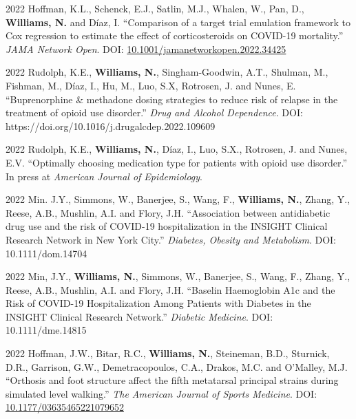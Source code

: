 \documentclass[12pt,letterpaper]{report}
\begin{document}
    \begin{tablist}
    
    		\item[2022] \tab Hoffman, K.L., Schenck, E.J., Satlin, M.J., Whalen, W., Pan, D., \textbf{Williams, N.} and Díaz, I. \enquote{Comparison of a target trial emulation framework to Cox regression to estimate the effect of corticosteroids on COVID-19 mortality.} \textit{JAMA Network Open}. DOI: \href{http://jamanetwork.com/article.aspx?doi=10.1001/jamanetworkopen.2022.34425}{10.1001/jamanetworkopen.2022.34425}
    
    	\item[2022] \tab Rudolph, K.E., \textbf{Williams, N.}, Singham-Goodwin, A.T., Shulman, M., Fishman, M., Díaz, I., Hu, M., Luo, S.X, Rotrosen, J. and Nunes, E. \enquote{Buprenorphine \& methadone dosing strategies to reduce risk of relapse in the treatment of opioid use disorder.} \textit{Drug and Alcohol Dependence}. DOI: https://doi.org/10.1016/j.drugalcdep.2022.109609
    
        \item[2022] \tab Rudolph, K.E., \textbf{Williams, N.}, Díaz, I., Luo, S.X., Rotrosen, J. and Nunes, E.V. \enquote{Optimally choosing medication type for patients with opioid use disorder.} In press at \textit{American Journal of Epidemiology}.
    
    \item[2022] \tab Min. J.Y., Simmons, W., Banerjee, S., Wang, F., \textbf{Williams, N.}, Zhang, Y., Reese, A.B., Mushlin, A.I. and Flory, J.H. \enquote{Association between antidiabetic drug use and the risk of COVID-19 hospitalization in the INSIGHT Clinical Research Network in New York City.} \textit{Diabetes, Obesity and Metabolism}. DOI: 10.1111/dom.14704
    
    \item[2022] \tab Min, J.Y., \textbf{Williams, N.}, Simmons, W., Banerjee, S., Wang, F., Zhang, Y., Reese, A.B., Mushlin, A.I. and Flory, J.H. \enquote{Baselin Haemoglobin A1c and the Risk of COVID-19 Hospitalization Among Patients with Diabetes in the INSIGHT Clinical Research Network.} \textit{Diabetic Medicine}. DOI: 10.1111/dme.14815 
    
    \item[2022] \tab Hoffman, J.W., Bitar, R.C., \textbf{Williams, N.}, Steineman, B.D., Sturnick, D.R., Garrison, G.W., Demetracopoulos, C.A., Drakos, M.C. and O'Malley, M.J. \enquote{Orthosis and foot structure affect the fifth metatarsal principal strains during simulated level walking.} \textit{The American Journal of Sports Medicine}. DOI: \href{https://doi.org/10.1177/03635465221079652}{10.1177/03635465221079652}
    

\end{tablist}
\end{document}
